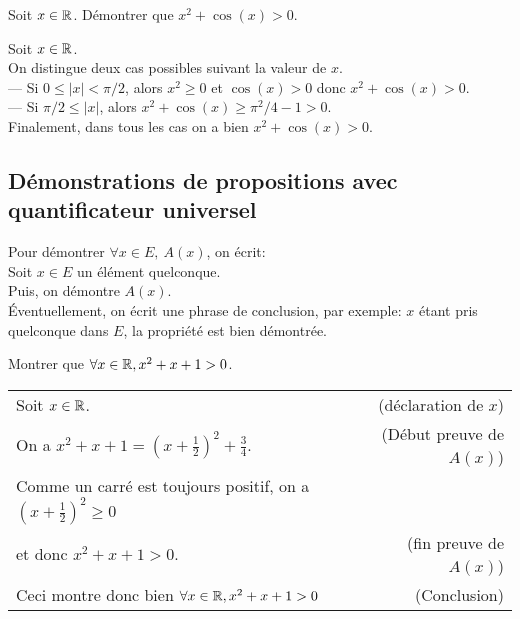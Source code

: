 {\begin{exemple}
Soit $x\in \mathbb{R}$. Démontrer que $x^2+\cos(x)>0$.
\begin{red}
Soit $x\in\mathbb{R}$.\\
On distingue deux cas possibles suivant la valeur de $x$.\\
--- Si $0\leq |x|< \pi/2$, alors $x^2\geq 0$ et $\cos(x)> 0$ donc $x^2+\cos(x)>0$.\\
--- Si  $\pi/2\leq|x|$, alors $x^2+\cos(x)\geq \pi^2/4-1>0$.\\
Finalement, dans tous les cas on a bien $x^2+\cos(x)>0$.
\end{red}
\end{exemple}

\subsection{Démonstrations de propositions avec quantificateur universel}$ $\\

Pour démontrer $\forall x\in E,\:A(x)$, on écrit:\\
\og Soit $x\in E$ un élément quelconque\fg.\\
Puis, on démontre $A(x)$.\\
Éventuellement, on écrit une phrase de conclusion, par exemple: \og $x$ étant pris quelconque dans $E$, la propriété est bien démontrée\fg.\\


\begin{exemple}
Montrer que $\forall x\in \mathbb{R}, x^2+x+1> 0$\fg.
\begin{red}
\begin{tabular}{lr}
Soit $x\in \mathbb{R}$. & (déclaration de $x$)\\
\hspace{1cm} On a $x^2+x+1 = (x+\frac12)^2+\frac34$. & (Début preuve de $A(x)$)\\
\hspace{1cm}Comme un carré est toujours positif, on a $(x+\frac12)^2 \geq 0$ & \\
\hspace{1cm} et donc  $x^2+x+1>0$. & (fin preuve de $A(x)$)\\
Ceci montre donc bien $\forall x\in \mathbb{R}, x^2+x+1>0$ & (Conclusion)\\
\end{tabular}
\end{red}
\end{exemple}


}
